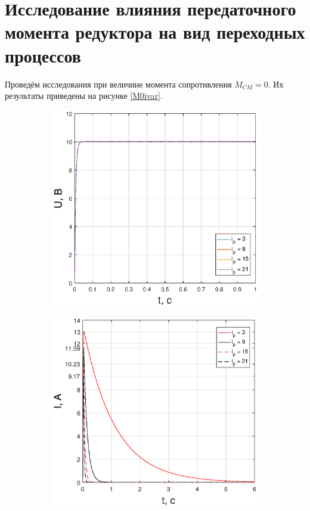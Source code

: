 \documentclass[fleqn, a4paper, 11pt, russian]{article}
\begin{document}
	\section{Исследование влияния передаточного момента редуктора на вид переходных процессов}
	Проведём исследования при величине момента сопротивления $M_{CM} = 0$. Их результаты приведены на рисунке \ref{M0ivar}.
	\begin{figure}[ht!]
		\centering
		\begin{subfigure}[b]{0.48\textwidth}
			\includegraphics[width = \textwidth]{ivar/eps/ivarU}
		\end{subfigure}
		\hfill
		\begin{subfigure}[b]{0.48\textwidth}
			\includegraphics[width = \textwidth]{ivar/eps/ivarI}
		\end{subfigure}
	\end{figure}
\end{document}
